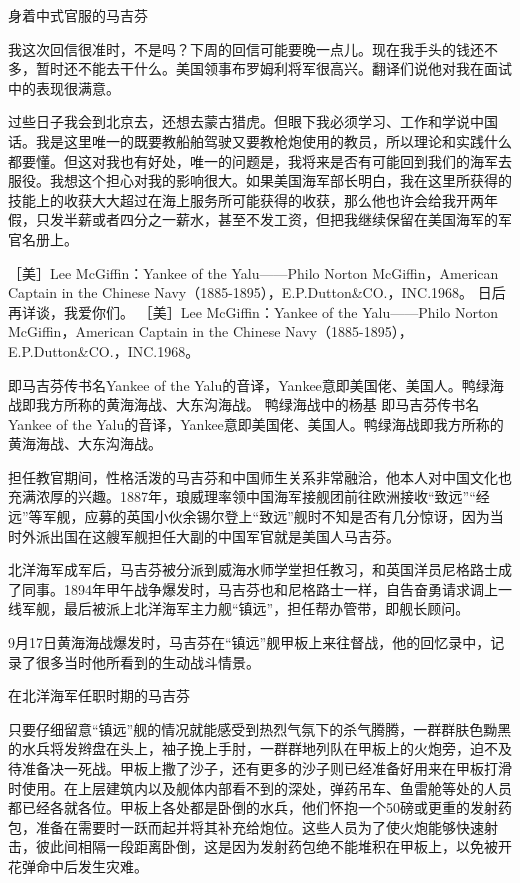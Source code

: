 \documentclass[12pt,UTF8]{ctexbook}
\begin{document}
身着中式官服的马吉芬

我这次回信很准时，不是吗？下周的回信可能要晚一点儿。现在我手头的钱还不多，暂时还不能去干什么。美国领事布罗姆利将军很高兴。翻译们说他对我在面试中的表现很满意。

过些日子我会到北京去，还想去蒙古猎虎。但眼下我必须学习、工作和学说中国话。我是这里唯一的既要教船舶驾驶又要教枪炮使用的教员，所以理论和实践什么都要懂。但这对我也有好处，唯一的问题是，我将来是否有可能回到我们的海军去服役。我想这个担心对我的影响很大。如果美国海军部长明白，我在这里所获得的技能上的收获大大超过在海上服务所可能获得的收获，那么他也许会给我开两年假，只发半薪或者四分之一薪水，甚至不发工资，但把我继续保留在美国海军的军官名册上。

［美］Lee McGiffin：Yankee of the Yalu——Philo Norton McGiffin，American Captain in the Chinese Navy（1885-1895），E.P.Dutton\&CO.，INC.1968。
日后再详谈，我爱你们。 ［美］Lee McGiffin：Yankee of the Yalu——Philo Norton McGiffin，American Captain in the Chinese Navy（1885-1895），E.P.Dutton\&CO.，INC.1968。

即马吉芬传书名Yankee of the Yalu的音译，Yankee意即美国佬、美国人。鸭绿海战即我方所称的黄海海战、大东沟海战。
鸭绿海战中的杨基 即马吉芬传书名Yankee of the Yalu的音译，Yankee意即美国佬、美国人。鸭绿海战即我方所称的黄海海战、大东沟海战。

担任教官期间，性格活泼的马吉芬和中国师生关系非常融洽，他本人对中国文化也充满浓厚的兴趣。1887年，琅威理率领中国海军接舰团前往欧洲接收“致远”“经远”等军舰，应募的英国小伙余锡尔登上“致远”舰时不知是否有几分惊讶，因为当时外派出国在这艘军舰担任大副的中国军官就是美国人马吉芬。

北洋海军成军后，马吉芬被分派到威海水师学堂担任教习，和英国洋员尼格路士成了同事。1894年甲午战争爆发时，马吉芬也和尼格路士一样，自告奋勇请求调上一线军舰，最后被派上北洋海军主力舰“镇远”，担任帮办管带，即舰长顾问。

9月17日黄海海战爆发时，马吉芬在“镇远”舰甲板上来往督战，他的回忆录中，记录了很多当时他所看到的生动战斗情景。


在北洋海军任职时期的马吉芬

只要仔细留意“镇远”舰的情况就能感受到热烈气氛下的杀气腾腾，一群群肤色黝黑的水兵将发辫盘在头上，袖子挽上手肘，一群群地列队在甲板上的火炮旁，迫不及待准备决一死战。甲板上撒了沙子，还有更多的沙子则已经准备好用来在甲板打滑时使用。在上层建筑内以及舰体内部看不到的深处，弹药吊车、鱼雷舱等处的人员都已经各就各位。甲板上各处都是卧倒的水兵，他们怀抱一个50磅或更重的发射药包，准备在需要时一跃而起并将其补充给炮位。这些人员为了使火炮能够快速射击，彼此间相隔一段距离卧倒，这是因为发射药包绝不能堆积在甲板上，以免被开花弹命中后发生灾难。
\end{document}
